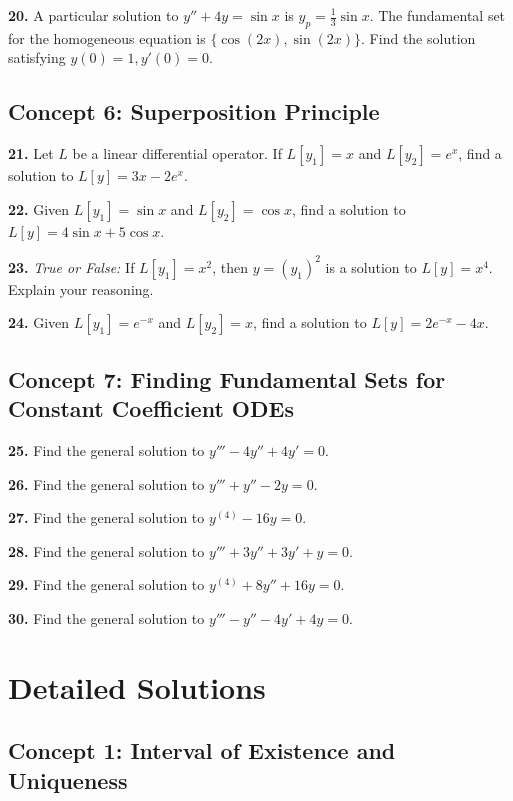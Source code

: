 \documentclass[12pt]{article}
\begin{document}
\textbf{20.} A particular solution to $y'' + 4y = \sin x$ is $y_p = \frac{1}{3}\sin x$. The fundamental set for the homogeneous equation is $\{\cos(2x), \sin(2x)\}$. Find the solution satisfying $y(0)=1, y'(0)=0$.

\subsection*{Concept 6: Superposition Principle}
\textbf{21.} Let $L$ be a linear differential operator. If $L[y_1] = x$ and $L[y_2] = e^x$, find a solution to $L[y] = 3x - 2e^x$.

\textbf{22.} Given $L[y_1] = \sin x$ and $L[y_2] = \cos x$, find a solution to $L[y] = 4\sin x + 5\cos x$.

\textbf{23.} \textit{True or False:} If $L[y_1] = x^2$, then $y = (y_1)^2$ is a solution to $L[y] = x^4$. Explain your reasoning.

\textbf{24.} Given $L[y_1] = e^{-x}$ and $L[y_2] = x$, find a solution to $L[y] = 2e^{-x} - 4x$.

\subsection*{Concept 7: Finding Fundamental Sets for Constant Coefficient ODEs}
\textbf{25.} Find the general solution to $y''' - 4y'' + 4y' = 0$.

\textbf{26.} Find the general solution to $y''' + y'' - 2y = 0$.

\textbf{27.} Find the general solution to $y^{(4)} - 16y = 0$.

\textbf{28.} Find the general solution to $y''' + 3y'' + 3y' + y = 0$.

\textbf{29.} Find the general solution to $y^{(4)} + 8y'' + 16y = 0$.

\textbf{30.} Find the general solution to $y''' - y'' - 4y' + 4y = 0$.

\newpage

\section{Detailed Solutions}

\subsection*{Concept 1: Interval of Existence and Uniqueness}
\end{document}
